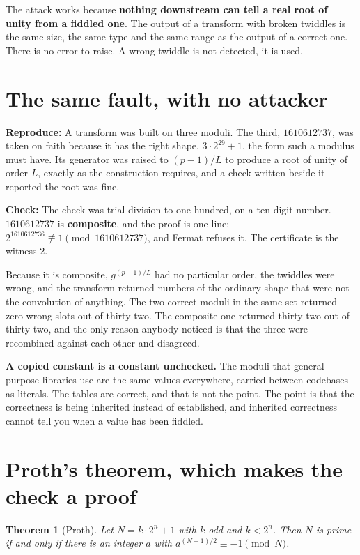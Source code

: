 \documentclass{article}
\newtheorem{theorem}{Theorem}
\begin{document}
The attack works because \textbf{nothing downstream can tell a real root of unity from a fiddled one}. The output of a transform with broken twiddles is the same size, the same type and the same range as the output of a correct one. There is no error to raise. A wrong twiddle is not detected, it is used.

\section{The same fault, with no attacker}

\textbf{Reproduce:} A transform was built on three moduli. The third, \(1610612737\), was taken on faith because it has the right shape, \(3 \cdot 2^{29} + 1\), the form such a modulus must have. Its generator was raised to \((p-1)/L\) to produce a root of unity of order \(L\), exactly as the construction requires, and a check written beside it reported the root was fine.

\textbf{Check:} The check was trial division to one hundred, on a ten digit number. \(1610612737\) is \textbf{composite}, and the proof is one line: \(2^{1610612736} \not\equiv 1 \pmod{1610612737}\), and Fermat refuses it. The certificate is the witness \(2\).

Because it is composite, \(g^{(p-1)/L}\) had no particular order, the twiddles were wrong, and the transform returned numbers of the ordinary shape that were not the convolution of anything. The two correct moduli in the same set returned zero wrong slots out of thirty-two. The composite one returned thirty-two out of thirty-two, and the only reason anybody noticed is that the three were recombined against each other and disagreed.

\textbf{A copied constant is a constant unchecked.} The moduli that general purpose libraries use are the same values everywhere, carried between codebases as literals. The tables are correct, and that is not the point. The point is that the correctness is being inherited instead of established, and inherited correctness cannot tell you when a value has been fiddled.

\section{Proth's theorem, which makes the check a proof}

\begin{theorem}[Proth]
Let \(N = k \cdot 2^n + 1\) with \(k\) odd and \(k < 2^n\). Then \(N\) is prime if and only if there is an integer \(a\) with \(a^{(N-1)/2} \equiv -1 \pmod N\).
\end{theorem}
\end{document}
